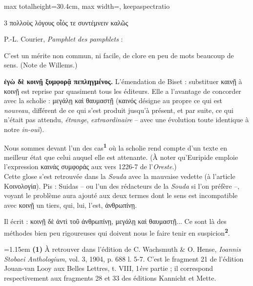 \documentclass[11pt,twoside]{book}
\newcommand{\italique}[1]{\textit{#1}}
\newcommand{\citComm}[1]{\begin{quoting}[vskip=0.4pt,leftmargin=0.7em,rightmargin=0.2em]#1\end{quoting}}
\newcommand{\francais}[1]{{\policeFr #1}}
\newcommand{\marqueur}[1]{\textsuperscript{\color{rubricRed}\textbf{#1}}}
\begin{document}
\begin{adjustbox}{max totalheight=30.4cm, max width=\textwidth, keepaspectratio}
\begin{minipage}{\textwidth}
{\begin{multicols}{3}
{πολλοὺς λόγους οἷός τε συντέμνειν καλῶς}
\par\vspace{1.5pt}
\noindent P.-L. Courier, \italique{Pamphlet des pamphlets} :
\citComm{\francais{C'est un mérite non commun, ni facile, de clore en peu de mots beaucoup de sens.}
(Note de Willems.)}
\par\vspace{1.5pt}
 \textbf{ἐγὼ δὲ κοινῇ ξυμφορᾷ πεπληγμένος.} L'émendation de Biset : substituer καινῇ à κοινῇ est reprise par quasiment tous les éditeurs. Elle a l'avantage de concorder avec la scholie : μεγάλῃ καὶ θαυμαστῇ (καινός désigne au propre ce qui est \italique{nouveau}, différent de ce qui s'est produit jusqu'à présent, et par suite, ce qui n'était pas attendu, \italique{étrange}, \italique{extraordinaire} – avec une évolution toute identique à notre \italique{in-ouï}).
\par\vspace{1.5pt}
\noindent Nous sommes devant l'un des cas\marqueur{1} où la scholie rend compte d'un texte en meilleur état que celui auquel elle est attenante. (À noter qu'Euripide emploie l'expression καινάς συμφοράς aux vers 1226-7 de l'\italique{Oreste}.)\\ Cette glose s'est retrouvée dans la \italique{Souda} avec la mauvaise vedette (à l'article Κοινολογία). Pis : Suidas -- ou l'un des rédacteurs de la \italique{Souda} si l'on préfère --, voyant le problème aura ajouté aux deux termes dont le sens est incompatible avec κοινῇ un tiers, qui, lui, l'est, ἀνθρωπίνῃ.
\par\vspace{1.5pt}
\noindent Il écrit : κοινῇ δὲ ἀντὶ τοῦ ἀνθρωπίνῃ, μεγάλῃ καὶ θαυμαστῇ... Ce sont là des méthodes bien peu rigoureuses qui doivent nous le faire tenir en suspicion\marqueur{2}.
\par\vspace{1.5pt}
\par\vspace{1.2pt}\par\nopagebreak\vspace{1pt}\noindent\hangindent=1.15em {\color{sepiaNote}\textbf{(1)}} À retrouver dans l'édition de C. Wachsmuth \& O. Hense, \italique{Ioannis Stobaei Anthologium}, vol. 3, 1904, p. 688 l. 5-7. C'est le fragment 21 de l'édition Jouan-van Looy aux Belles Lettres, t. VIII, 1\italique{ère} partie ; il correspond respectivement aux fragments 28 et 33 des éditions Kannicht et Mette.

\end{multicols}}
\end{minipage}
\end{adjustbox}
\end{document}
